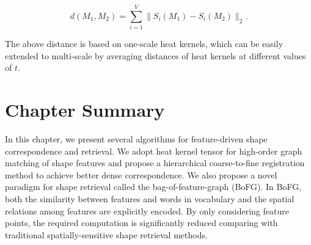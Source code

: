 \begin{equation}
d(M_1,M_2)=\sum_{i=1}^{V}\|S_i(M_1)-S_i(M_2) \|_2.
\end{equation}

The above distance is based on one-scale heat kernels, which can be easily extended to 
multi-scale by averaging distances of heat kernels at different values of $t$.

\section{Chapter Summary}

In this chapter, we present several algorithms for feature-driven shape
correspondence and retrieval. We adopt heat kernel tensor for high-order
graph matching of shape features and propose a hierarchical coarse-to-fine
registration method to achieve better dense correspondence. We also propose
a novel paradigm for shape retrieval called the bag-of-feature-graph (BoFG). 
In BoFG, both the similarity between features and words in vocabulary and 
the spatial relations among features are explicitly encoded. By only considering
feature points, the required computation is significantly reduced comparing 
with traditional spatially-sensitive shape retrieval methods. 
